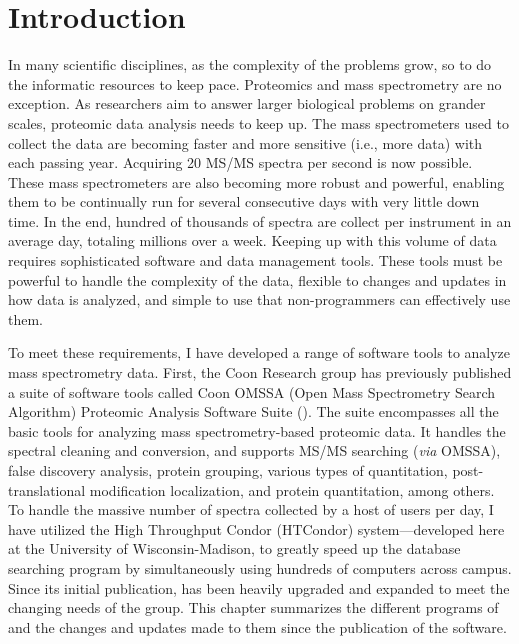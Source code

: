 \section{Introduction}
In many scientific disciplines, as the complexity of the problems grow, so to do the informatic resources to keep pace. Proteomics and mass spectrometry are no exception. As researchers aim to answer larger biological problems on grander scales, proteomic data analysis needs to keep up. The mass spectrometers used to collect the data are becoming faster and more sensitive (i.e., more data) with each passing year. Acquiring 20 MS/MS spectra per second is now possible. These mass spectrometers are also becoming more robust and powerful, enabling them to be continually run for several consecutive days with very little down time. In the end, hundred of thousands of spectra are collect per instrument in an average day, totaling millions over a week. Keeping up with this volume of data requires sophisticated software and data management tools. These tools must be powerful to handle the complexity of the data, flexible to changes and updates in how data is analyzed, and simple to use that non-programmers can effectively use them. 

To meet these requirements, I have developed a range of software tools to analyze mass spectrometry data. First, the Coon Research group has previously published a suite of software tools called Coon OMSSA (Open Mass Spectrometry Search Algorithm) Proteomic Analysis Software Suite (\compass{}). The suite encompasses all the basic tools for analyzing mass spectrometry-based proteomic data. It handles the spectral cleaning and conversion, and supports MS/MS searching (\emph{via} OMSSA)\cite{omssa}, false discovery analysis, protein grouping, various types of quantitation, post-translational modification localization, and protein quantitation, among others. To handle the massive number of spectra collected by a host of users per day, I have utilized the High Throughput Condor (HTCondor) system---developed here at the University of Wisconsin-Madison, to greatly speed up the database searching program by simultaneously using hundreds of computers across campus. Since its initial publication, \compass{} has been heavily upgraded and expanded to meet the changing needs of the group. This chapter summarizes the different programs of \compass{} and the changes and updates made to them since the publication of the software.

